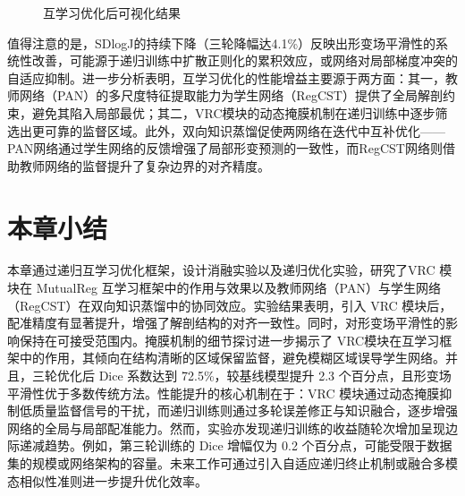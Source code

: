 \begin{figure}[h]
    \centering
    \label{fig:7-2}
    \caption{互学习优化后可视化结果}
\end{figure}

值得注意的是，SDlogJ的持续下降（三轮降幅达4.1\%）反映出形变场平滑性的系统性改善，可能源于递归训练中扩散正则化的累积效应，或网络对局部梯度冲突的自适应抑制。进一步分析表明，互学习优化的性能增益主要源于两方面：其一，教师网络（PAN）的多尺度特征提取能力为学生网络（RegCST）提供了全局解剖约束，避免其陷入局部最优；其二，VRC模块的动态掩膜机制在递归训练中逐步筛选出更可靠的监督区域。此外，双向知识蒸馏促使两网络在迭代中互补优化——PAN网络通过学生网络的反馈增强了局部形变预测的一致性，而RegCST网络则借助教师网络的监督提升了复杂边界的对齐精度。

\section{本章小结}

本章通过递归互学习优化框架，设计消融实验以及递归优化实验，研究了VRC 模块在 MutualReg 互学习框架中的作用与效果以及教师网络（PAN）与学生网络（RegCST）在双向知识蒸馏中的协同效应。实验结果表明，引入 VRC 模块后，配准精度有显著提升，增强了解剖结构的对齐一致性。同时，对形变场平滑性的影响保持在可接受范围内。掩膜机制的细节探讨进一步揭示了 VRC模块在互学习框架中的作用，其倾向在结构清晰的区域保留监督，避免模糊区域误导学生网络。并且，三轮优化后 Dice 系数达到 72.5\%，较基线模型提升 2.3 个百分点，且形变场平滑性优于多数传统方法。性能提升的核心机制在于：VRC 模块通过动态掩膜抑制低质量监督信号的干扰，而递归训练则通过多轮误差修正与知识融合，逐步增强网络的全局与局部配准能力。然而，实验亦发现递归训练的收益随轮次增加呈现边际递减趋势。例如，第三轮训练的 Dice 增幅仅为 0.2 个百分点，可能受限于数据集的规模或网络架构的容量。未来工作可通过引入自适应递归终止机制或融合多模态相似性准则进一步提升优化效率。